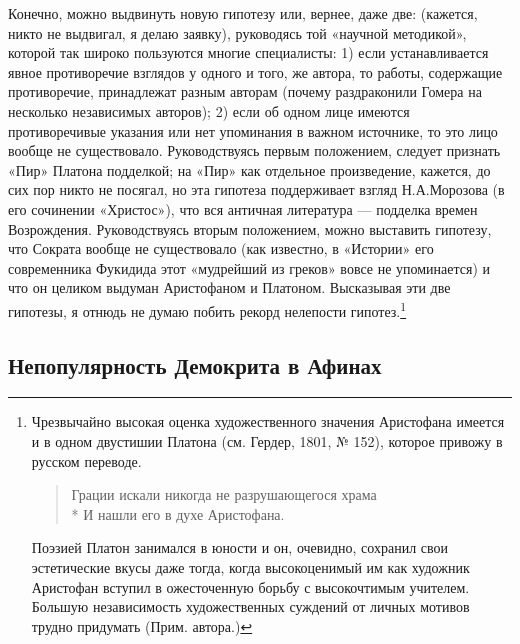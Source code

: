 Конечно, можно выдвинуть новую гипотезу или, вернее, даже две:
(кажется, никто не выдвигал, я делаю заявку), руководясь той «научной
методикой», которой так широко пользуются многие специалисты: 1) если
устанавливается явное противоречие взглядов у одного и того, же
автора, то работы, содержащие противоречие, принадлежат разным авторам
(почему раздраконили Гомера на несколько независимых авторов); 2) если
об одном лице имеются противоречивые указания или нет упоминания в
важном источнике, то это лицо вообще не существовало. Руководствуясь
первым положением, следует признать «Пир» Платона подделкой; на «Пир»
как отдельное произведение, кажется, до сих пор никто не посягал, но
эта гипотеза поддерживает взгляд Н.А.Морозова (в его сочинении
«Христос»), что вся античная литература --- подделка времен
Возрождения. Руководствуясь вторым положением, можно выставить
гипотезу, что Сократа вообще не существовало (как известно, в
«Истории» его современника Фукидида этот «мудрейший из греков» вовсе
не упоминается) и что он целиком выдуман Аристофаном и Платоном.
Высказывая эти две гипотезы, я отнюдь не думаю побить рекорд нелепости
гипотез.\footnote{Чрезвычайно высокая оценка художественного значения
Аристофана имеется и в одном двустишии Платона (см. Гердер,
1801, № 152), которое привожу в русском переводе.

\begin{verse}
        Грации искали никогда не разрушающегося храма\\*
        И нашли его в духе Аристофана.
\end{verse}

Поэзией Платон занимался в юности и он, очевидно, сохранил свои
эстетические вкусы даже тогда, когда высокоценимый им как художник
Аристофан вступил в ожесточенную борьбу с высокочтимым учителем.
Большую независимость художественных суждений от личных мотивов трудно
придумать (Прим. автора.)}

\subsection{Непопулярность Демокрита в Афинах}

